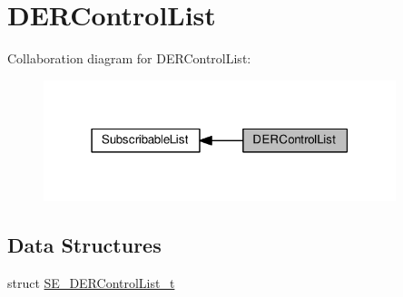 \hypertarget{group__DERControlList}{}\section{D\+E\+R\+Control\+List}
\label{group__DERControlList}
Collaboration diagram for D\+E\+R\+Control\+List\+:\nopagebreak
\begin{figure}[H]
\begin{center}
\leavevmode
\includegraphics[width=291pt]{group__DERControlList}
\end{center}
\end{figure}
\subsection*{Data Structures}
\begin{DoxyCompactItemize}
\item 
struct \hyperlink{structSE__DERControlList__t}{S\+E\+\_\+\+D\+E\+R\+Control\+List\+\_\+t}
\end{DoxyCompactItemize}
